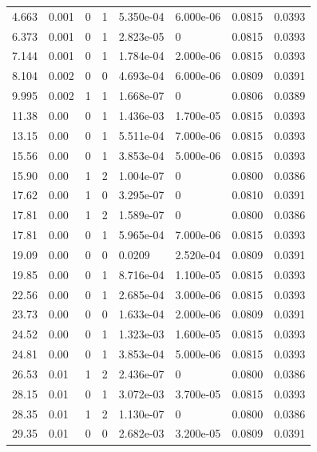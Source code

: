 \documentclass[preview]{standalone}
\begin{document}
{{\begin{tabular}{L{1.2cm}C{1.2cm} C{0.3cm}C{0.5cm} C{1.4cm}C{1.4cm} C{1.4cm}C{1.4cm}}
  4.663  &  0.001  & 0     &  1 &  5.350e-04  & 6.000e-06  & 0.0815 &  0.0393   \\ 
  6.373  &  0.001  & 0     &  1 &  2.823e-05  & 0  & 0.0815 &  0.0393   \\ 
  7.144  &  0.001  & 0     &  1 &  1.784e-04  & 2.000e-06  & 0.0815 &  0.0393   \\ 
  8.104  &  0.002  & 0     &  0 &  4.693e-04  & 6.000e-06  & 0.0809 &  0.0391   \\ 
  9.995  &  0.002  & 1     &  1 &  1.668e-07  & 0  & 0.0806 &  0.0389   \\ 
  11.38  &  0.00  & 0     &  1 &  1.436e-03  & 1.700e-05  & 0.0815 &  0.0393   \\ 
  13.15  &  0.00  & 0     &  1 &  5.511e-04  & 7.000e-06  & 0.0815 &  0.0393   \\ 
  15.56  &  0.00  & 0     &  1 &  3.853e-04  & 5.000e-06  & 0.0815 &  0.0393   \\ 
  15.90  &  0.00  & 1     &  2 &  1.004e-07  & 0  & 0.0800 &  0.0386   \\ 
  17.62  &  0.00  & 1     &  0 &  3.295e-07  & 0  & 0.0810 &  0.0391   \\ 
  17.81  &  0.00  & 1     &  2 &  1.589e-07  & 0  & 0.0800 &  0.0386   \\ 
  17.81  &  0.00  & 0     &  1 &  5.965e-04  & 7.000e-06  & 0.0815 &  0.0393   \\ 
  19.09  &  0.00  & 0     &  0 &  0.0209  & 2.520e-04  & 0.0809 &  0.0391   \\ 
  19.85  &  0.00  & 0     &  1 &  8.716e-04  & 1.100e-05  & 0.0815 &  0.0393   \\ 
  22.56  &  0.00  & 0     &  1 &  2.685e-04  & 3.000e-06  & 0.0815 &  0.0393   \\ 
  23.73  &  0.00  & 0     &  0 &  1.633e-04  & 2.000e-06  & 0.0809 &  0.0391   \\ 
  24.52  &  0.00  & 0     &  1 &  1.323e-03  & 1.600e-05  & 0.0815 &  0.0393   \\ 
  24.81  &  0.00  & 0     &  1 &  3.853e-04  & 5.000e-06  & 0.0815 &  0.0393   \\ 
  26.53  &  0.01  & 1     &  2 &  2.436e-07  & 0  & 0.0800 &  0.0386   \\ 
  28.15  &  0.01  & 0     &  1 &  3.072e-03  & 3.700e-05  & 0.0815 &  0.0393   \\ 
  28.35  &  0.01  & 1     &  2 &  1.130e-07  & 0  & 0.0800 &  0.0386   \\ 
  29.35  &  0.01  & 0     &  0 &  2.682e-03  & 3.200e-05  & 0.0809 &  0.0391   \\ 

\end{tabular}}}
\end{document}
